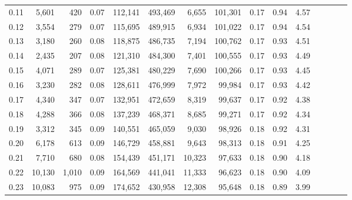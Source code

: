 \begin{tabular}{rrrcrrrrrrrrrrr}
0.11 &   5,601 &    420 &                                       0.07 &  112,141 &  493,469 &    6,655 &  101,301 &  0.17 &  0.94 &                         4.57 \\
0.12 &   3,554 &    279 &                                       0.07 &  115,695 &  489,915 &    6,934 &  101,022 &  0.17 &  0.94 &                         4.54 \\
0.13 &   3,180 &    260 &                                       0.08 &  118,875 &  486,735 &    7,194 &  100,762 &  0.17 &  0.93 &                         4.51 \\
0.14 &   2,435 &    207 &                                       0.08 &  121,310 &  484,300 &    7,401 &  100,555 &  0.17 &  0.93 &                         4.49 \\
0.15 &   4,071 &    289 &                                       0.07 &  125,381 &  480,229 &    7,690 &  100,266 &  0.17 &  0.93 &                         4.45 \\
0.16 &   3,230 &    282 &                                       0.08 &  128,611 &  476,999 &    7,972 &   99,984 &  0.17 &  0.93 &                         4.42 \\
0.17 &   4,340 &    347 &                                       0.07 &  132,951 &  472,659 &    8,319 &   99,637 &  0.17 &  0.92 &                         4.38 \\
0.18 &   4,288 &    366 &                                       0.08 &  137,239 &  468,371 &    8,685 &   99,271 &  0.17 &  0.92 &                         4.34 \\
0.19 &   3,312 &    345 &                                       0.09 &  140,551 &  465,059 &    9,030 &   98,926 &  0.18 &  0.92 &                         4.31 \\
0.20 &   6,178 &    613 &                                       0.09 &  146,729 &  458,881 &    9,643 &   98,313 &  0.18 &  0.91 &                         4.25 \\
0.21 &   7,710 &    680 &                                       0.08 &  154,439 &  451,171 &   10,323 &   97,633 &  0.18 &  0.90 &                         4.18 \\
0.22 &  10,130 &  1,010 &                                       0.09 &  164,569 &  441,041 &   11,333 &   96,623 &  0.18 &  0.90 &                         4.09 \\
0.23 &  10,083 &    975 &                                       0.09 &  174,652 &  430,958 &   12,308 &   95,648 &  0.18 &  0.89 &                         3.99 \\

\end{tabular}
